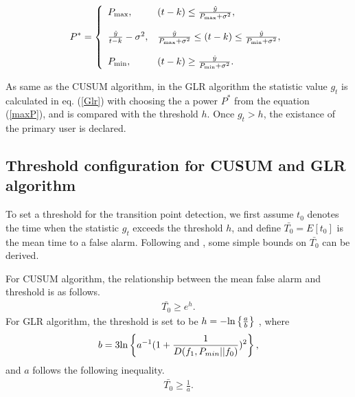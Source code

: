 \begin{equation}
P^{*}=
\left\{
\begin{array}{ll}
P_{{\rm max}}, & (t-k)\leq\frac{\hat{y}}{P_{{\rm max}}+\sigma^2}, \\
\\ \nonumber
\frac{\hat{y}}{t-k}-\sigma^2, & \frac{\hat{y}}{P_{{\rm max}}+\sigma^2}\leq(t-k)\leq\frac{\hat{y}}{P_{{\rm min}}+\sigma^2}, \\
\\ \nonumber
P_{{\rm min}}, & (t-k) \geq \frac{\hat{y}}{P_{{\rm min}}+\sigma^2}.
\end{array}
\right.
\label{maxP}
\end{equation}

As same as the CUSUM algorithm, in the GLR algorithm the statistic value $g_t$ is calculated in eq. (\ref{Glr}) with choosing the a power $P^{*}$ from the equation (\ref{maxP}), and is compared with the threshold $h$. Once $g_t>h$, the existance of the primary user is declared.

\subsection{Threshold configuration for CUSUM and GLR algorithm}
To set a threshold for the transition point detection, we first assume $t_0$ denotes the time when the statistic $g_t$ exceeds the threshold $h$, and define $\bar{T_0}=E[t_0]$ is the mean time to a false alarm. Following \cite{ref:threshold_cusum} and \cite{ref:threshold_GLR}, some simple bounds on $\bar{T_0}$ can be derived.

For CUSUM algorithm, the relationship between the mean false alarm and threshold is as follows.
\begin{eqnarray}
\bar{T_0} \geq e^h.
\end{eqnarray}
For GLR algorithm, the threshold is set to be $h=-{\rm ln}\left\{\frac{a}{b}\right\}$ , where 
\begin{eqnarray}
b=3{\rm ln}\left\{a^{-1}(1+\frac{1}{D(f_1,P_{min}||f_0)})^2\right\},
\end{eqnarray}
and $a$ follows the following inequality.
\begin{eqnarray}
\bar{T_0} \geq \frac{1}{a}.
\end{eqnarray}
